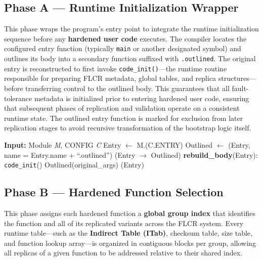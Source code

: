 \clearpage
\subsection*{Phase A — Runtime Initialization Wrapper}
This phase wraps the program’s entry point to integrate the runtime initialization sequence
before any \textbf{hardened user code} executes.
The compiler locates the configured entry function (typically \texttt{main} or another designated symbol)
and outlines its body into a secondary function suffixed with \texttt{.outlined}.
The original entry is reconstructed to first invoke \texttt{code\_init()}—the runtime routine responsible
for preparing FLCR metadata, global tables, and replica structures—before transferring control
to the outlined body.
This guarantees that all fault-tolerance metadata is initialized prior to entering hardened user code,
ensuring that subsequent phases of replication and validation operate on a consistent runtime state.
The outlined entry function is marked for exclusion from later replication stages to avoid
recursive transformation of the bootstrap logic itself.

\begin{algorithm}[H]
\caption{Phase A — Outline Entry and Inject Initialization}
\label{alg:phaseA}
\begin{algorithmic}[1]
\State \textbf{Input:} Module \textit{M}, CONFIG \textit{C}
\State Entry $\gets$ M.(C.ENTRY)
 \State \Return \EndIf
\State Outlined $\gets$ (Entry, name = Entry.name + ``.outlined'')
\State {}(Entry $\rightarrow$ Outlined)
\State \textbf{rebuild\_body}(Entry):
\State \hspace{\algorithmicindent} \texttt{code\_init}()
\State \hspace{\algorithmicindent} Outlined(original\_args)
\State {}(Entry)
\end{algorithmic}
\end{algorithm}
\clearpage

\subsection*{Phase B — Hardened Function Selection}
This phase assigns each hardened function a \textbf{global group index}
that identifies the function and all of its replicated variants across the FLCR system.
Every runtime table—such as the \textbf{Indirect Table (ITab)}, checksum table,
size table, and function lookup array—is organized in contiguous blocks per group,
allowing all replicas of a given function to be addressed relative to their shared index.

